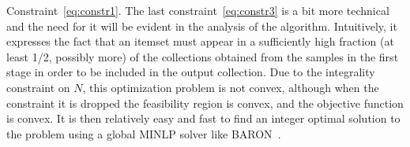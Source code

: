 Constraint~\eqref{eq:constr1}. The last constraint~\eqref{eq:constr3} is a bit
more technical and the need for it will be evident in the analysis of the
algorithm. Intuitively, it expresses the fact that an itemset must appear in a
sufficiently high fraction (at least 1/2, possibly more) of the collections obtained from the samples in the
first stage in order to be included in the output collection. Due to the integrality constraint on
$N$, this optimization problem is not convex, although when the constraint it is
dropped the feasibility region is convex, and the objective function is convex.
It is then relatively easy and fast to find an integer optimal solution to the
problem using a global MINLP solver like BARON~\cite{baron}. 


